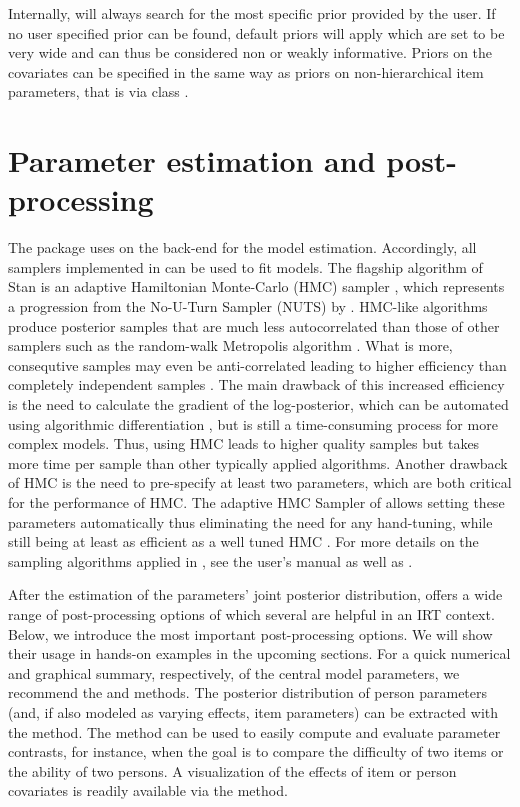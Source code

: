 \documentclass[jss]{jss}
\begin{document}
Internally,  will always search for the most specific prior
provided by the user. If no user specified prior can be found, default
priors will apply which are set to be very wide and can thus be
considered non or weakly informative. Priors on the covariates can be
specified in the same way as priors on non-hierarchical item parameters,
that is via class .

\hypertarget{estimation}{%
\section{Parameter estimation and post-processing}\label{estimation}}

The  package uses  \citep{carpenter2017} on the
back-end for the model estimation. Accordingly, all samplers implemented
in  can be used to fit  models. The flagship
algorithm of Stan is an adaptive Hamiltonian Monte-Carlo (HMC) sampler
\citep{betancourt2014, betancourt2017, stanM2019}, which represents a
progression from the No-U-Turn Sampler (NUTS) by \citet{hoffman2014}.
HMC-like algorithms produce posterior samples that are much less
autocorrelated than those of other samplers such as the random-walk
Metropolis algorithm \citep{hoffman2014, creutz1988}. What is more,
consequtive samples may even be anti-correlated leading to higher
efficiency than completely independent samples \citep{vehtari2019}. The
main drawback of this increased efficiency is the need to calculate the
gradient of the log-posterior, which can be automated using algorithmic
differentiation \citep{griewank2008}, but is still a time-consuming
process for more complex models. Thus, using HMC leads to higher quality
samples but takes more time per sample than other typically applied
algorithms. Another drawback of HMC is the need to pre-specify at least
two parameters, which are both critical for the performance of HMC. The
adaptive HMC Sampler of  allows setting these parameters
automatically thus eliminating the need for any hand-tuning, while still
being at least as efficient as a well tuned HMC \citep{hoffman2014}. For
more details on the sampling algorithms applied in , see
the  user's manual \citep{stanM2019} as well as
\citet{hoffman2014}.

After the estimation of the parameters' joint posterior distribution,
 offers a wide range of post-processing options of which
several are helpful in an IRT context. Below, we introduce the most
important post-processing options. We will show their usage in hands-on
examples in the upcoming sections. For a quick numerical and graphical
summary, respectively, of the central model parameters, we recommend the
 and  methods. The posterior distribution of
person parameters (and, if also modeled as varying effects, item
parameters) can be extracted with the  method. The
 method can be used to easily compute and evaluate
parameter contrasts, for instance, when the goal is to compare the
difficulty of two items or the ability of two persons. A visualization
of the effects of item or person covariates is readily available via the
 method.
\end{document}
